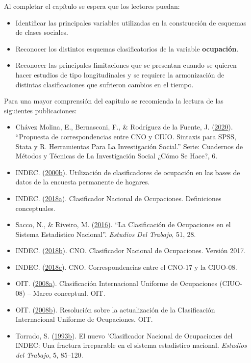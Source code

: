 \documentclass[
]{article}
\providecommand{\tightlist}{%
  \setlength{\itemsep}{0pt}\setlength{\parskip}{0pt}}
\begin{document}
Al completar el capítulo se espera que los lectores puedan:

\begin{itemize}
\tightlist
\item
  Identificar las principales variables utilizadas en la construcción de esquemas de clases sociales.
\item
  Reconocer los distintos esquemas clasificatorios de la variable \textbf{ocupación}.
\item
  Reconocer las principales limitaciones que se presentan cuando se quieren hacer estudios de tipo longitudinales y se requiere la armonización de distintas clasificaciones que sufrieron cambios en el tiempo.
\end{itemize}

Para una mayor comprensión del capítulo se recomienda la lectura de las siguientes publicaciones:

\begin{itemize}
\item
  Chávez Molina, E., Bernasconi, F., \& Rodríguez de la Fuente, J. (\protect\hyperlink{ref-ChavezMolina.etal2020}{2020}). ``Propuesta de correspondencias entre CNO y CIUO. Sintaxis para SPSS, Stata y R. Herramientas Para La Investigación Social.'' Serie: Cuadernos de Métodos y Técnicas de La Investigación Social ¿Cómo Se Hace?, 6.
\item
  INDEC. (\protect\hyperlink{ref-INDEC2000a}{2000b}). Utilización de clasificadores de ocupación en las bases de datos de la encuesta permanente de hogares.
\item
  INDEC. (\protect\hyperlink{ref-INDEC2018}{2018a}). Clasificador Nacional de Ocupaciones. Definiciones conceptuales.
\item
  Sacco, N., \& Riveiro, M. (\protect\hyperlink{ref-Sacco2016b}{2016}). ``La Clasificación de Ocupaciones en el Sistema Estadístico Nacional''. \emph{Estudios Del Trabajo}, 51, 28.
\item
  INDEC. (\protect\hyperlink{ref-INDEC2018a}{2018b}). CNO. Clasificador Nacional de Ocupaciones. Versión 2017.
\item
  INDEC. (\protect\hyperlink{ref-INDEC2018b}{2018c}). CNO. Correspondencias entre el CNO-17 y la CIUO-08.
\item
  OIT. (\protect\hyperlink{ref-OIT2008}{2008a}). Clasificación Internacional Uniforme de Ocupaciones (CIUO-08) -- Marco conceptual. OIT.
\item
  OIT. (\protect\hyperlink{ref-OIT2008a}{2008b}). Resolución sobre la actualización de la Clasificación Internacional Uniforme
  de Ocupaciones. OIT.
\item
  Torrado, S. (\protect\hyperlink{ref-Torrado1993a}{1993b}). El nuevo 'Clasificador Nacional de Ocupaciones del INDEC: Una fractura irreparable en el sistema estadístico nacional. \emph{Estudios del Trabajo}, 5, 85--120.
\end{itemize}
\end{document}
